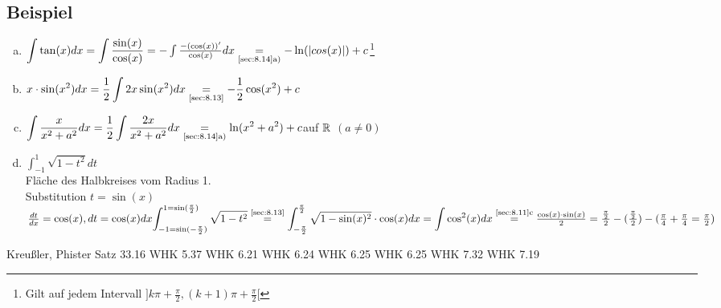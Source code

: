 \subsection{Beispiel}
\begin{enumerate}[a)]
\item ${\displaystyle \int \tan(x)dx = \int \frac{\sin(x)}{\cos(x)}} = - \int \frac{-(\cos(x))'}{\cos(x)}dx \underset{\text{\ref{sec:8.14}a)}}{=} - \ln(\lvert cos(x) \rvert) +c$\footnote{Gilt auf jedem Intervall $]k\pi + \frac{\pi}{2}, (k+1)\pi+\frac{\pi}{2}[$}
\item ${\displaystyle x \cdot \sin(x^2)dx = \frac{1}{2} \int 2x \sin(x^2)dx \underset{\text{\ref{sec:8.13}}}{=} - \frac{1}{2}\cos(x^2) +c}$
\item ${\displaystyle \int \frac{x}{x^2+a^2}dx = \frac{1}{2} \int \frac{2x}{x^2 + a^2}dx \underset{\text{\ref{sec:8.14}a)}}{=} \ln(x^2+a^2) + c}$auf $\mathbb{R}$ $(a \ne 0)$
\item ${\displaystyle \int_{-1}^{1} \sqrt{1-t^2}dt}$\\
Fläche des Halbkreises vom Radius 1.\\
Substitution $t = \sin(x)$\\
$\frac{dt}{dx} = \cos(x), dt = \cos(x)dx\\
{\displaystyle \int_{-1=\sin(-\frac{\pi}{2})}^{1= \sin(\frac{\pi}{2})}\sqrt{1-t^2} \overset{\text{\ref{sec:8.13}}}{=}\int_{-\frac{\pi}{2}}^{\frac{\pi}{2}}
\sqrt{1-\sin(x)^2} \cdot \cos(x)dx = \int\cos^2(x)}dx \overset{\text{\ref{sec:8.11}c}}{=} \frac{\cos(x) \cdot \sin(x)}{2} = \frac{\frac{\pi}{2}}{2} - (\frac{\frac{\pi}{2}}{2}) - (\frac{\pi}{4} + \frac{\pi}{4} = \frac{\pi}{2})$ 
\end{enumerate}
\begin{thebibliography}{9}
 Kreu\ss ler, Phister Satz 33.16
 WHK 5.37
 WHK 6.21
 WHK 6.24
 WHK 6.25
 WHK 6.25
 WHK 7.32
 WHK 7.19
\end{thebibliography}
